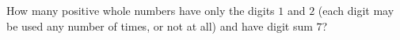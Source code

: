 How many positive whole numbers have only the digits $1$ and $2$ (each digit may be used any number of times, or not at all) and have digit sum $7$?
